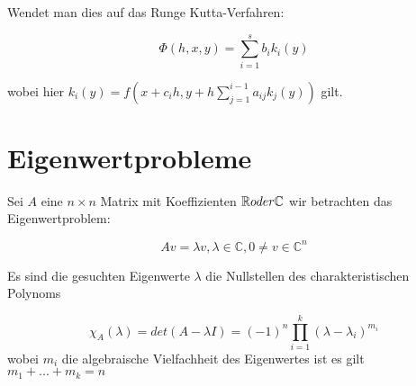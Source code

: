 \documentclass{report}
\begin{document}
Wendet man dies auf das Runge Kutta-Verfahren:

\begin{equation}
    \Phi(h,x,y) = \sum_{i=1}^s b_i k_i(y)
\end{equation}

wobei hier $k_i(y) = f(x + c_i h, y + h\sum_{j=1}^{i-1}a_{ij}k_j(y))$ gilt.


\section{Eigenwertprobleme} %
\label{sec:eigenwertprobleme}

Sei $A$ eine $n \times n$ Matrix mit Koeffizienten $\RR oder \mathbb{C}$ wir betrachten das Eigenwertproblem:

\begin{equation}
    Av = \lambda v, \lambda \in \mathbb{C}, 0 \neq v \in \mathbb{C}^n
\end{equation}

Es sind die gesuchten Eigenwerte $\lambda$ die Nullstellen des charakteristischen Polynoms

\begin{equation}
    \chi_A(\lambda) = det(A- \lambda I) = (-1)^n \prod_{i=1}^k(\lambda-\lambda_i)^{m_i}
\end{equation}
wobei $m_i$ die algebraische Vielfachheit des Eigenwertes ist es gilt $m_1+...+m_k = n$
\end{document}
